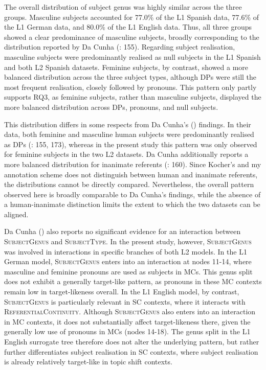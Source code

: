 \documentclass[
  letterpaper,
  DIV=11,
  numbers=noendperiod]{scrartcl}
\begin{document}
The overall distribution of subject genus was highly similar across the
three groups. Masculine subjects accounted for 77.0\% of the L1 Spanish
data, 77.6\% of the L1 German data, and 80.0\% of the L1 English data.
Thus, all three groups showed a clear predominance of masculine
subjects, broadly corresponding to the distribution reported by Da Cunha
(: 155). Regarding subject realisation,
masculine subjects were predominantly realised as null subjects in the
L1 Spanish and both L2 Spanish datasets. Feminine subjects, by contrast,
showed a more balanced distribution across the three subject types,
although DPs were still the most frequent realisation, closely followed
by pronouns. This pattern only partly supports RQ3, as feminine
subjects, rather than masculine subjects, displayed the more balanced
distribution across DPs, pronouns, and null subjects.

This distribution differs in some respects from Da Cunha's
() findings. In their data, both
feminine and masculine human subjects were predominantly realised as DPs
(: 155, 173), whereas in the present
study this pattern was only observed for feminine subjects in the two L2
datasets. Da Cunha additionally reports a more balanced distribution for
inanimate referents (: 160). Since
Kocher's and my annotation scheme does not distinguish between human and
inanimate referents, the distributions cannot be directly compared.
Nevertheless, the overall pattern observed here is broadly comparable to
Da Cunha's findings, while the absence of a human-inanimate distinction
limits the extent to which the two datasets can be aligned.

Da Cunha () also reports no significant
evidence for an interaction between \textsc{SubjectGenus} and
\textsc{SubjectType}. In the present study, however,
\textsc{SubjectGenus} was involved in interactions in specific branches
of both L2 models. In the L1 German model, \textsc{SubjectGenus} enters
into an interaction at nodes 11-14, where masculine and feminine
pronouns are used as subjects in MCs. This genus split does not exhibit
a generally target-like pattern, as pronouns in these MC contexts remain
low in target-likeness overall. In the L1 English model, by contrast,
\textsc{SubjectGenus} is particularly relevant in SC contexts, where it
interacts with \textsc{ReferentialContinuity}. Although
\textsc{SubjectGenus} also enters into an interaction in MC contexts, it
does not substantially affect target-likeness there, given the generally
low use of pronouns in MCs (nodes 14-18). The genus split in the L1
English surrogate tree therefore does not alter the underlying pattern,
but rather further differentiates subject realisation in SC contexts,
where subject realisation is already relatively target-like in topic
shift contexts.
\end{document}
